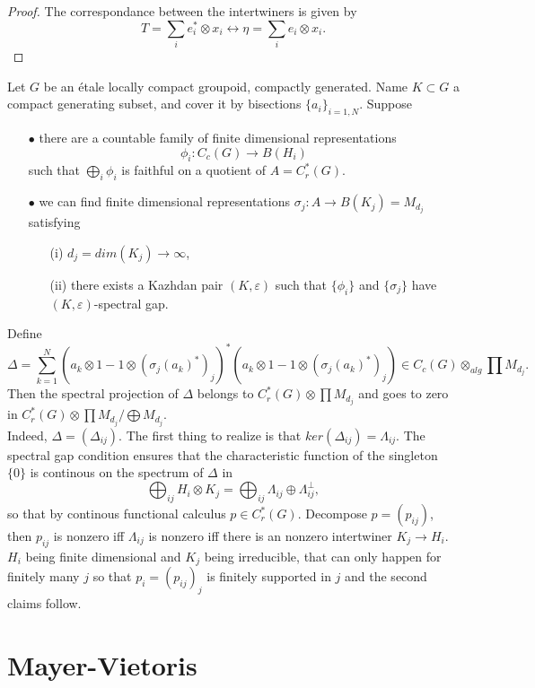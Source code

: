 \begin{proof}
The correspondance between the intertwiners is given by 
\[ T = \sum_i e_i^*\otimes x_i \longleftrightarrow \eta= \sum_i e_i \otimes x_i.\]  
\end{proof}

Let $G$ be an \'etale locally compact groupoid, compactly generated. Name $K\subset G$ a compact generating subset, and cover it by bisections $\{a_i\}_{i=1,N}$. 
Suppose
\begin{itemize}
\item[$\bullet$] there are a countable family of finite dimensional representations
\[\phi_i : C_c(G)\rightarrow B(H_i)\]
such that $\bigoplus_i \phi_i$ is faithful on a quotient of $A= C^*_r (G)$. 
\item[$\bullet$] we can find finite dimensional representations $\sigma_j : A \rightarrow B(K_j)= M_{d_j}$ satisfying
	\begin{itemize}
	\item[(i)] $d_j= dim(K_j) \rightarrow \infty$,
	\item[(ii)] there exists a Kazhdan pair $(K,\varepsilon)$ such that $\{\phi_i\}$ and $\{\sigma_j\}$ have $(K,\varepsilon)$-spectral gap.
	\end{itemize}
\end{itemize}  
Define
\[\Delta =\sum_{k=1}^N  (a_k \otimes 1 - 1\otimes (\sigma_j(a_k)^*)_j)^*(a_k \otimes 1 - 1\otimes (\sigma_j(a_k)^*)_j) \in C_c(G)\otimes_{alg} \prod M_{d_j}.  \]
Then the spectral projection of $\Delta$ belongs to $C^*_r(G) \otimes \prod M_{d_j}$ and goes to zero in $C^*_r(G) \otimes \prod M_{d_j}/\bigoplus M_{d_j}$.\\

Indeed, $\Delta= (\Delta_{ij})$.
The first thing to realize is that $ker(\Delta_{ij})=\Lambda_{ij}$. The spectral gap condition ensures that the characteristic function of the singleton $\{0\}$ is continous on the spectrum of $\Delta$ in 
\[\bigoplus_{ij} H_i \otimes K_j = \bigoplus_{ij} \Lambda_{ij} \oplus \Lambda_{ij}^{\perp}, \]
so that by continous functional calculus $p \in C_r^*(G)$. Decompose $p =(p_{ij})$, then $p_{ij}$ is nonzero iff $\Lambda_{ij}$ is nonzero iff there is an nonzero intertwiner $K_j \rightarrow H_i$. $H_i$ being finite dimensional and $K_j$ being irreducible, that can only happen for finitely many $j$ so that $p_i =(p_{ij})_j$ is finitely supported in $j$ and the second claims follow. 


\newpage
\section{Mayer-Vietoris}

